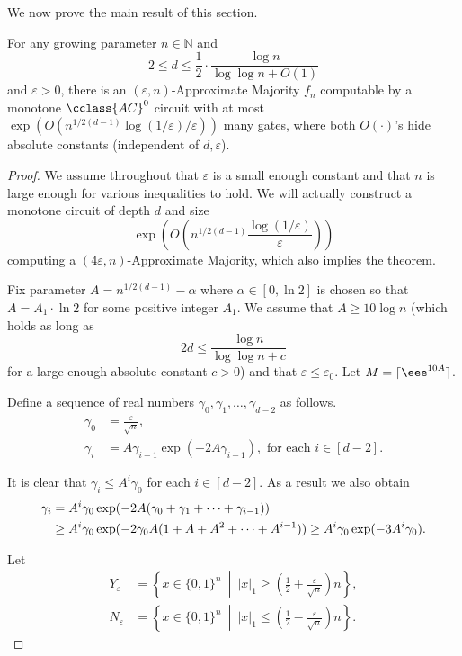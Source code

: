 \documentclass{toc}
\newcommand{\eps}{\varepsilon}
\newcommand{\AC}{\cclass{AC}}
\begin{document}
We now prove the main result of this section. 

\begin{theorem}
\label{thm:amano-ckt}
For any growing parameter $n\in \mathbb{N}$ and
\[
  2 \le d \le \frac{1}{2}\cdot \frac{\log n}{\log\log n + O(1)}
\]
and $\eps > 0$, there is an $(\varepsilon,n)$-Approximate Majority
$f_n$ computable by a monotone $\AC^0$ circuit with at most
$\exp(O(n^{1/2(d-1)}\log(1/\varepsilon)/\varepsilon))$ many gates,
where both $O(\cdot)$'s hide absolute constants (independent of
$d,\varepsilon$).
\end{theorem}

\begin{proof}
  We assume throughout that $\varepsilon$ is a small enough constant and that $n$ is large enough for various inequalities to hold. We will actually construct a monotone circuit of depth $d$ and size
  \[
    \exp\left(O\left(n^{1/2(d-1)}\frac{\log(1/\varepsilon)}{\varepsilon}\right)\right)
  \]
  computing a $(4\varepsilon,n)$-Approximate Majority, which also implies the theorem. 

  Fix parameter $A= n^{1/2(d-1)} - \alpha$ where $\alpha \in [0,\ln 2]$ is chosen so that $A = A_1\cdot \ln 2$ for some positive integer $A_1$. We assume that $A\geq 10\log n$ (which holds as long as
  \[
    2d \le \frac{\log n}{\log\log n + c}
  \]
  for a large enough absolute constant $c > 0$) and that
  $\varepsilon \leq \varepsilon_0$. Let $M = \lceil \eee^{10A}\rceil$.


Define a sequence of real numbers $\gamma_0,\gamma_1,\ldots,\gamma_{d-2}$ as follows.
\begin{align*}
\gamma_0 &= \frac{\varepsilon}{\sqrt{n}},\\
\gamma_i &= A\gamma_{i-1}\exp(-2A\gamma_{i-1}), \text{ for each $i\in [d-2]$.}
\end{align*}

It is clear that $\gamma_i \leq A^i \gamma_0$ for each $i\in [d-2]$. As a result we also obtain 
\begin{align}
\gamma_i &= A^i \gamma_0\exp(-2A(\gamma_0+\gamma_1+\cdots+\gamma_{i-1}))\notag\\
&\geq A^i \gamma_0\exp(-2\gamma_0A(1+A+A^2+\cdots+A^{i-1})) \geq A^i\gamma_0\exp(-3A^i\gamma_0).\label{eq:gamma-i}
\end{align}

Let
\begin{align*}
Y_\varepsilon &= \left\{x\in \{0,1\}^n\ \middle|\ |x|_1\geq \left(\frac{1}{2}+\frac{\varepsilon}{\sqrt{n}}\right)n\right\},\\
N_\varepsilon &= \left\{x\in \{0,1\}^n\ \middle|\ |x|_1\leq \left(\frac{1}{2}-\frac{\varepsilon}{\sqrt{n}}\right)n\right\}.
\end{align*}


\end{proof}
\end{document}
